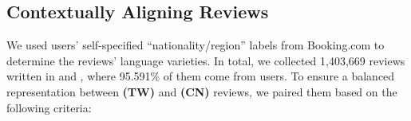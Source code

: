 \subsection{Contextually Aligning Reviews}
We used users' self-specified ``nationality/region'' labels from Booking.com to determine the reviews' language varieties. %
In total, we collected 1,403,669 reviews written in \twChinese and \cnChinese, where 95.591\% of them come from \twChinese users.
To ensure a balanced representation between \textbf{\twChinese (TW)} and \textbf{\cnChinese (CN)} reviews, we paired them based on the following criteria:


\vspace{-.8pc}

